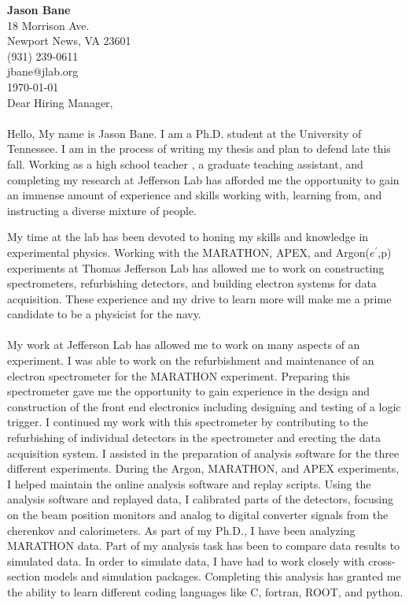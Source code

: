 \documentclass[12pt,letterpaper]{article}
\newcommand{\CPP}
{C\nolinebreak[4]\hspace{-.05em}\raisebox{.22ex}{\footnotesize\bf ++}}
\begin{document}


\vspace*{-1.2cm}
{\textbf{Jason Bane}}\\
18 Morrison Ave. \\
Newport News, VA 23601 \\
(931) 239-0611 \\
jbane@jlab.org \\
\today\\

Dear Hiring Manager,

\paragraph{}Hello, My name is Jason Bane. I am a Ph.D. student at the University of Tennessee. I am in the process of writing my thesis and plan to defend late this fall. Working as a high school teacher , a graduate teaching assistant, and completing my research at Jefferson Lab has afforded me the opportunity to gain an immense amount of experience and skills working with, learning from, and instructing a diverse mixture of people.

My time at the lab has been devoted to honing my skills and knowledge in experimental physics. Working with the MARATHON, APEX, and Argon($e^\prime$,p) experiments at Thomas Jefferson Lab has allowed me to work on constructing spectrometers, refurbishing detectors, and building electron systems for data acquisition. These experience and my drive to learn more will make me a prime candidate to be a physicist for the navy.
\paragraph{}My work at Jefferson Lab has allowed me to work on many aspects of an experiment. I was able to work on the refurbishment and maintenance of an electron spectrometer for the MARATHON experiment. Preparing this spectrometer gave me the opportunity to gain experience in the design and construction of the front end electronics including designing and testing of a logic trigger. I continued my work with this spectrometer by contributing to the refurbishing of individual detectors in the spectrometer and erecting the data acquisition system. I assisted in the preparation of analysis software for the three different experiments. During the Argon, MARATHON, and APEX experiments, I helped maintain the online analysis software and replay scripts. Using the analysis software and replayed data, I calibrated parts of the detectors, focusing on the beam position monitors and analog to digital converter signals from the cherenkov and calorimeters. As part of my Ph.D., I have been analyzing MARATHON data. Part of my analysis task has been to compare data results to simulated data. In order to simulate data, I have had to work closely with cross-section models and simulation packages. Completing this analysis has granted me the ability to learn different coding languages like \CPP, fortran, ROOT, and python.
\end{document}
